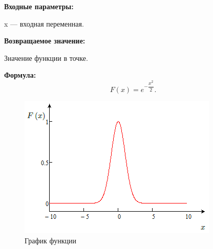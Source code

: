 \textbf{Входные параметры:}

 x --- входная переменная.

\textbf{Возвращаемое значение:}
 
 Значение функции в точке.
 
\textbf{Формула:}
\begin{equation*}
F\left(x \right)=e^{-\dfrac{x^2}{2}}.
\end{equation*}

 \begin{figure} [h] 
   \center
   \includegraphics {HML_ExpMSxD2_Graph.png}
   \caption{График функции} 
   \label{img:HML_ExpMSxD2_Graph}  
 \end{figure}
 
